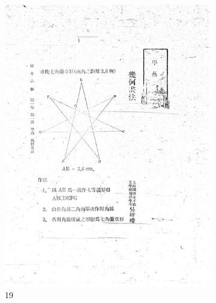 \documentclass[12pt,twoside]{report}
\begin{document}
\begin{appendices}
\begin{figure}[htbp]
\begin{subfigure}[b]{0.23\linewidth}
        \includegraphics[width=\linewidth]{./figures/testset/19.jpg}
        \caption{19}
        \label{fig:test_19}
    \end{subfigure}
    \hfill
    \begin{subfigure}[b]{0.23\linewidth}

\end{subfigure}
\end{figure}
\end{appendices}
\end{document}
